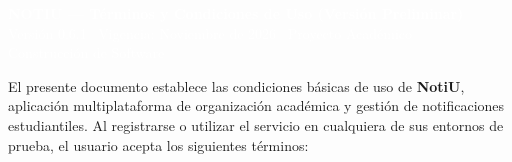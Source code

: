\documentclass[10pt,letterpaper]{article}
\begin{document}
\noindent
\colorbox{notiuDark}{%
  \parbox{\dimexpr\textwidth-2\fboxsep\relax}{%
    \vspace{4pt}
    {\Large\bfseries\textcolor{white}{NOTIU --- Términos y Condiciones de Uso (Versión Preliminar)}}\\[2pt]
    {\footnotesize\textcolor{white}{Versión 0.6.1 \textbar\ Vigencia: Noviembre de 2026 \textbar\ Proyecto Académico --- Construcción de Software}}
    \vspace{4pt}
  }%
}

\vspace{4pt}
{\small
El presente documento establece las condiciones básicas de uso de \textbf{NotiU}, aplicación multiplataforma de organización académica y gestión de notificaciones estudiantiles. Al registrarse o utilizar el servicio en cualquiera de sus entornos de prueba, el usuario acepta los siguientes términos:}
\end{document}

